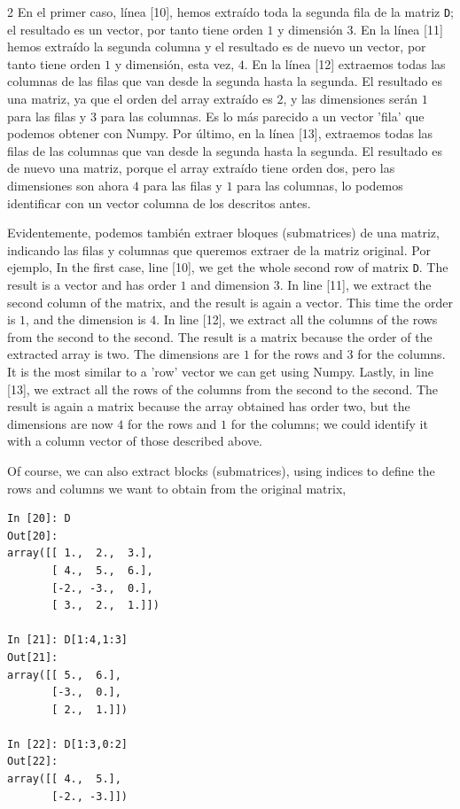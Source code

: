 \begin{paracol}{2}
En el primer caso, línea [10], hemos extraído toda la segunda fila de la matriz \texttt{D}; el resultado es un vector, por tanto tiene orden $1$ y dimensión $3$. En la línea [11] hemos extraído la segunda columna y el resultado es de nuevo un vector, por tanto tiene orden $1$ y dimensión, esta vez, $4$. En la línea [12] extraemos todas las columnas de las filas que van desde la segunda hasta la segunda. El resultado es una matriz, ya que el orden del array extraído es $2$, y las dimensiones serán $1$ para las filas y $3$ para las columnas. Es lo más parecido a un vector 'fila' que podemos obtener con Numpy. Por último, en la línea [13], extraemos todas las filas de las columnas que van desde la segunda hasta la segunda. El resultado es de nuevo una matriz, porque el array extraído tiene orden dos, pero las dimensiones son ahora $4$ para las filas y $1$ para las columnas, lo podemos identificar con un vector columna de los descritos antes.

Evidentemente, podemos también extraer bloques (submatrices) de una matriz, indicando las filas y columnas que queremos extraer de la matriz original. Por ejemplo,
\switchcolumn
In the first case, line [10], we get the whole second row of matrix \texttt{D}. The result is a vector and has order $1$ and dimension $3$. In line [11], we extract the second column of the matrix, and the result is again a vector. This time the order is $1$, and the dimension is $4$. In line [12], we extract all the columns of the rows from the second to the second. The result is a matrix because the order of the extracted array is two. The dimensions are $1$ for the rows and $3$ for the columns. It is the most similar to a 'row' vector we can get using Numpy. Lastly, in line [13], we extract all the rows of the columns from the second to the second. The result is again a matrix because the array obtained has order two, but the dimensions are now $4$ for the rows and $1$ for the columns; we could identify it with a column vector of those described above. 

Of course, we can also extract blocks (submatrices), using indices to define the rows and columns we want to obtain from the original matrix,
\end{paracol}

\begin{center}
 \begin{minipage}{0.3\textwidth}
    \begin{verbatim}
In [20]: D
Out[20]: 
array([[ 1.,  2.,  3.],
       [ 4.,  5.,  6.],
       [-2., -3.,  0.],
       [ 3.,  2.,  1.]])

In [21]: D[1:4,1:3]
Out[21]: 
array([[ 5.,  6.],
       [-3.,  0.],
       [ 2.,  1.]])

In [22]: D[1:3,0:2]
Out[22]: 
array([[ 4.,  5.],
       [-2., -3.]])
    \end{verbatim}
 \end{minipage}
\end{center}

